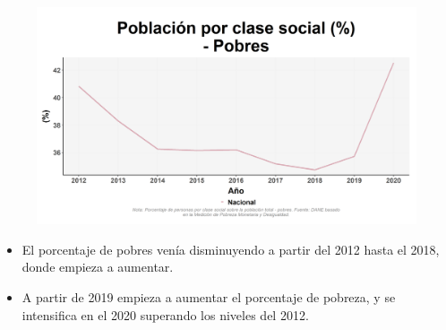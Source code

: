     \begin{figure}[H]
        \caption[Población por clase social - Pobres a nivel nacional ]{\label{pobres_nacional} }
        \begin{center}
        \includegraphics[width=\textwidth,keepaspectratio]{img/var_242_trend.png}
        \end{center}
    \end{figure}
            \begin{itemize}
                    \item El porcentaje de pobres venía disminuyendo a partir del 2012 hasta el 2018, donde empieza a aumentar.
                    \item A partir de 2019 empieza a aumentar el porcentaje de pobreza, y se intensifica en el 2020 superando los niveles del 2012.
                    \end{itemize}

